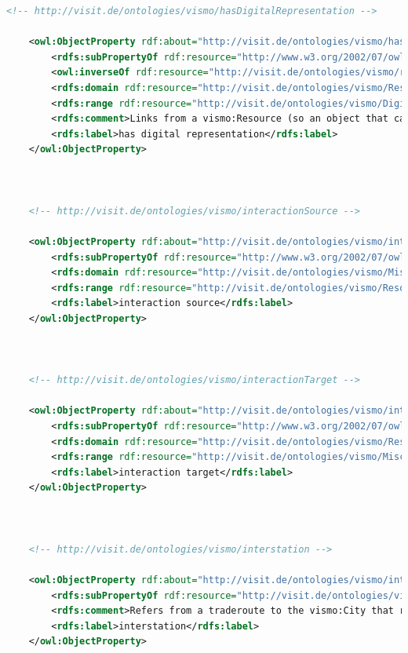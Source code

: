 \begin{lstlisting}[caption={VisMo Ontologie in der letzten (englischen) Version.},label={lst:vismo},captionpos=b,language=xml]
    <!-- http://visit.de/ontologies/vismo/hasDigitalRepresentation -->

    <owl:ObjectProperty rdf:about="http://visit.de/ontologies/vismo/hasDigitalRepresentation">
        <rdfs:subPropertyOf rdf:resource="http://www.w3.org/2002/07/owl#topObjectProperty"/>
        <owl:inverseOf rdf:resource="http://visit.de/ontologies/vismo/representsDigitally"/>
        <rdfs:domain rdf:resource="http://visit.de/ontologies/vismo/Resource"/>
        <rdfs:range rdf:resource="http://visit.de/ontologies/vismo/DigitalRepresentation"/>
        <rdfs:comment>Links from a vismo:Resource (so an object that can be further specified in the ViSIT context) to a digital representation of it, e.g. a picture that shows the respective resource, a 3D model, etc.</rdfs:comment>
        <rdfs:label>has digital representation</rdfs:label>
    </owl:ObjectProperty>
    


    <!-- http://visit.de/ontologies/vismo/interactionSource -->

    <owl:ObjectProperty rdf:about="http://visit.de/ontologies/vismo/interactionSource">
        <rdfs:subPropertyOf rdf:resource="http://www.w3.org/2002/07/owl#topObjectProperty"/>
        <rdfs:domain rdf:resource="http://visit.de/ontologies/vismo/MiscellaneousInteraction"/>
        <rdfs:range rdf:resource="http://visit.de/ontologies/vismo/Resource"/>
        <rdfs:label>interaction source</rdfs:label>
    </owl:ObjectProperty>
    


    <!-- http://visit.de/ontologies/vismo/interactionTarget -->

    <owl:ObjectProperty rdf:about="http://visit.de/ontologies/vismo/interactionTarget">
        <rdfs:subPropertyOf rdf:resource="http://www.w3.org/2002/07/owl#topObjectProperty"/>
        <rdfs:domain rdf:resource="http://visit.de/ontologies/vismo/Resource"/>
        <rdfs:range rdf:resource="http://visit.de/ontologies/vismo/MiscellaneousInteraction"/>
        <rdfs:label>interaction target</rdfs:label>
    </owl:ObjectProperty>
    


    <!-- http://visit.de/ontologies/vismo/interstation -->

    <owl:ObjectProperty rdf:about="http://visit.de/ontologies/vismo/interstation">
        <rdfs:subPropertyOf rdf:resource="http://visit.de/ontologies/vismo/routeLocation"/>
        <rdfs:comment>Refers from a traderoute to the vismo:City that represents a interstation for the route.</rdfs:comment>
        <rdfs:label>interstation</rdfs:label>
    </owl:ObjectProperty>
    



\end{lstlisting}
